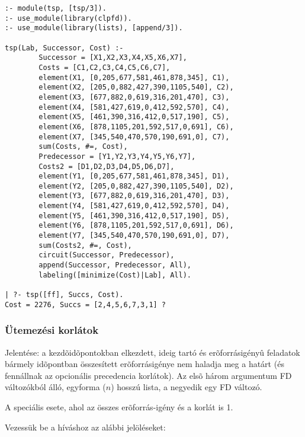 \begin{verbatim}
:- module(tsp, [tsp/3]).
:- use_module(library(clpfd)).
:- use_module(library(lists), [append/3]).

tsp(Lab, Successor, Cost) :-
        Successor = [X1,X2,X3,X4,X5,X6,X7],
        Costs = [C1,C2,C3,C4,C5,C6,C7],
        element(X1, [0,205,677,581,461,878,345], C1),
        element(X2, [205,0,882,427,390,1105,540], C2),
        element(X3, [677,882,0,619,316,201,470], C3),
        element(X4, [581,427,619,0,412,592,570], C4),
        element(X5, [461,390,316,412,0,517,190], C5),
        element(X6, [878,1105,201,592,517,0,691], C6),
        element(X7, [345,540,470,570,190,691,0], C7),
        sum(Costs, #=, Cost),
        Predecessor = [Y1,Y2,Y3,Y4,Y5,Y6,Y7],
        Costs2 = [D1,D2,D3,D4,D5,D6,D7],
        element(Y1, [0,205,677,581,461,878,345], D1),
        element(Y2, [205,0,882,427,390,1105,540], D2),
        element(Y3, [677,882,0,619,316,201,470], D3),
        element(Y4, [581,427,619,0,412,592,570], D4),
        element(Y5, [461,390,316,412,0,517,190], D5),
        element(Y6, [878,1105,201,592,517,0,691], D6),
        element(Y7, [345,540,470,570,190,691,0], D7),
        sum(Costs2, #=, Cost),
        circuit(Successor, Predecessor),
        append(Successor, Predecessor, All),
        labeling([minimize(Cost)|Lab], All).

| ?- tsp([ff], Succs, Cost).
Cost = 2276, Succs = [2,4,5,6,7,3,1] ? 
\end{verbatim}

\subsubsection{Ütemezési korlátok}

{}

Jelentése: a  kezdõidõpontokban elkezdett,  ideig tartó
és  erõforrásigényû feladatok bármely idõpontban összesített
erõforrásigénye nem haladja meg a  határt (és fennállnak az opcionális
precedencia korlátok). Az elsõ három argumentum FD változókból álló, egyforma ($n$)
hosszú lista, a negyedik egy FD változó. 

\medskip

{}

A  speciális esete, ahol az összes erõforrás-igény és a korlát is 1.

\br
Vezessük be a  híváshoz az alábbi jelöléseket:

